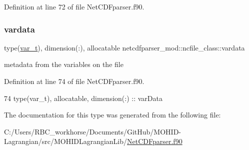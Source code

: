 Definition at line 72 of file Net\+C\+D\+Fparser.\+f90.

\mbox{\label{structnetcdfparser__mod_1_1ncfile__class_af4da1e5ae03037a7a8a8543713dcb8cd}} 
\subsubsection{\texorpdfstring{vardata}{vardata}}
{\footnotesize\ttfamily type(\mbox{\hyperlink{structnetcdfparser__mod_1_1var__t}{var\+\_\+t}}), dimension(\+:), allocatable netcdfparser\+\_\+mod\+::ncfile\+\_\+class\+::vardata\hspace{0.3cm}{\ttfamily [private]}}



metadata from the variables on the file 



Definition at line 74 of file Net\+C\+D\+Fparser.\+f90.


\begin{DoxyCode}
74         \textcolor{keywordtype}{type}(var\_t), \textcolor{keywordtype}{allocatable}, \textcolor{keywordtype}{dimension(:)} :: varData
\end{DoxyCode}


The documentation for this type was generated from the following file\+:\begin{DoxyCompactItemize}
\item 
C\+:/\+Users/\+R\+B\+C\+\_\+workhorse/\+Documents/\+Git\+Hub/\+M\+O\+H\+I\+D-\/\+Lagrangian/src/\+M\+O\+H\+I\+D\+Lagrangian\+Lib/\mbox{\hyperlink{_net_c_d_fparser_8f90}{Net\+C\+D\+Fparser.\+f90}}\end{DoxyCompactItemize}
